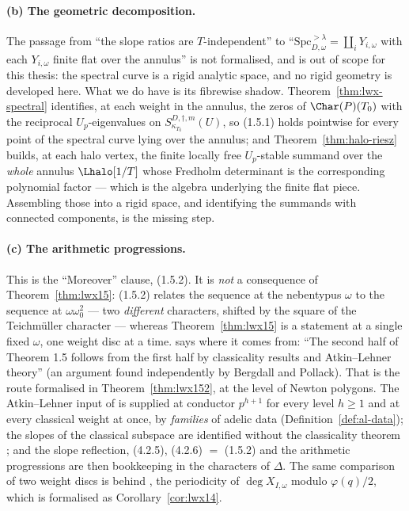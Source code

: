 \paragraph{(b) The geometric decomposition.}  The passage from ``the slope ratios are
$T$-independent'' to ``$\mathrm{Spc}^{>\lambda}_{D,\omega} = \coprod_i Y_{i,\omega}$ with each
$Y_{i,\omega}$ finite flat over the annulus'' is not formalised, and is out of scope for this
thesis: the spectral curve is a rigid analytic space, and no rigid geometry is developed here.
What we do have is its fibrewise shadow.  Theorem~\ref{thm:lwx-spectral} identifies, at each
weight in the annulus, the zeros of $\Char(P)(T_0)$ with the reciprocal $U_p$-eigenvalues on
$S^{D,\dagger,m}_{\kappa_{T_0}}(U)$, so (1.5.1) holds pointwise for every point of the spectral
curve lying over the annulus; and Theorem~\ref{thm:halo-riesz} builds, at each halo vertex, the
finite locally free $U_p$-stable summand over the \emph{whole} annulus $\Lhalo[1/T]$ whose
Fredholm determinant is the corresponding polynomial factor --- which is the algebra underlying
the finite flat piece.  Assembling those into a rigid space, and identifying the summands with
connected components, is the missing step.

\paragraph{(c) The arithmetic progressions.}  This is the ``Moreover'' clause, (1.5.2).  It is
\emph{not} a consequence of Theorem~\ref{thm:lwx15}: (1.5.2) relates the sequence at the
nebentypus $\omega$ to the sequence at $\omega\omega_0^{2}$ --- two \emph{different} characters,
shifted by the square of the Teichm\"uller character --- whereas Theorem~\ref{thm:lwx15} is a
statement at a single fixed $\omega$, one weight disc at a time.  \cite[Remark 1.6(4)]{LWX} says
where it comes from: ``The second half of Theorem 1.5 follows from the first half by classicality
results and Atkin--Lehner theory'' (an argument found independently by Bergdall and Pollack).
That is the route formalised in Theorem~\ref{thm:lwx152}, at the level of Newton polygons.  The
Atkin--Lehner input of \cite[\S3.23 Step I]{LWX} is supplied at conductor $p^{h+1}$ for every
level $h \geq 1$ and at every classical weight at once, by \emph{families} of adelic data
(Definition~\ref{def:al-data}); the slopes of the classical subspace are identified without the
classicality theorem \cite[Proposition 2.15]{LWX}; and the slope reflection, (4.2.5),
(4.2.6) $=$ (1.5.2) and the arithmetic progressions are then bookkeeping in the characters of
$\Delta$.  The same comparison of two weight discs is behind \cite[Corollary 1.4]{LWX}, the
periodicity of $\deg X_{I,\omega}$ modulo $\varphi(q)/2$, which is formalised as
Corollary~\ref{cor:lwx14}.

